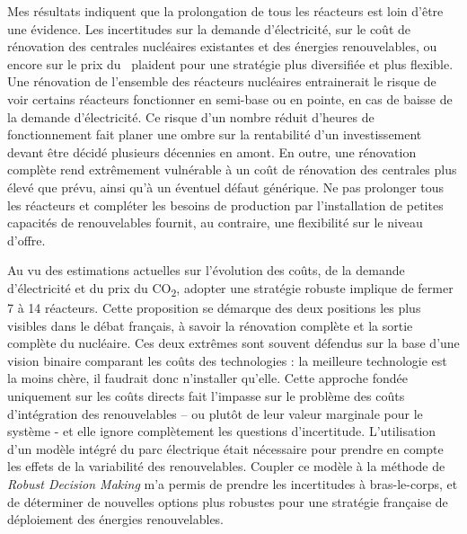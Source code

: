 Mes résultats indiquent que la prolongation de tous les réacteurs est loin d’être une évidence. Les incertitudes sur la demande d'électricité, sur le coût de rénovation des centrales nucléaires existantes et des énergies renouvelables, ou encore sur le prix du \coo\ plaident pour une stratégie plus diversifiée et plus flexible. 
Une rénovation de l'ensemble des réacteurs nucléaires entrainerait le risque de voir certains réacteurs fonctionner en semi-base ou en pointe, en cas de baisse de la demande d’électricité. Ce risque d'un nombre réduit d'heures de fonctionnement fait planer une ombre sur la rentabilité d'un investissement devant être décidé plusieurs décennies en amont.
En outre, une rénovation complète rend extrêmement vulnérable à un coût de rénovation des centrales plus élevé que prévu, ainsi qu'à un éventuel défaut générique. 
Ne pas prolonger tous les réacteurs et compléter les besoins de production par l'installation de petites capacités de renouvelables fournit, au contraire, une flexibilité sur le niveau d'offre.

Au vu des estimations actuelles sur l'évolution des coûts, de la demande d'électricité et du prix du CO\textsubscript{2}, adopter une stratégie robuste implique de fermer 7 à 14 réacteurs. Cette proposition se démarque des deux positions les plus visibles dans le débat français, à savoir la rénovation complète et la sortie complète du nucléaire. Ces deux extrêmes sont souvent défendus sur la base d’une vision binaire comparant les coûts des technologies : la meilleure technologie est la moins chère, il faudrait donc n'installer qu'elle. Cette approche fondée uniquement sur les coûts directs fait l’impasse sur le problème des coûts d’intégration des renouvelables – ou plutôt de leur valeur marginale pour le système - et elle ignore complètement les questions d’incertitude. L'utilisation d'un modèle intégré du parc électrique était nécessaire pour prendre en compte les effets de la variabilité des renouvelables. Coupler ce modèle à la méthode de \textit{Robust Decision Making} m'a permis de prendre les incertitudes à bras-le-corps, et de déterminer de nouvelles options plus robustes pour une stratégie française de déploiement des énergies renouvelables.


